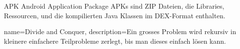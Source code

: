 {APK}
{Android Application Package}
{
	APKs sind ZIP Dateien, die Libraries, Ressourcen, und die kompilierten Java Klassen im DEX-Format enthalten.
}


{
	name={Divide and Conquer},
	description={Ein grosses Problem wird rekursiv in kleinere einfachere Teilprobleme zerlegt, bis man dieses einfach lösen kann.}
}